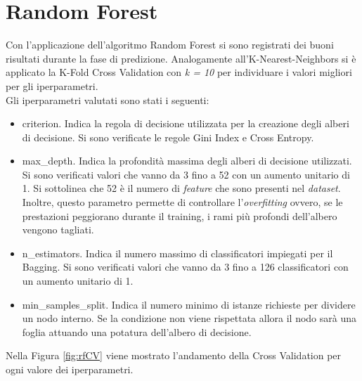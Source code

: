 \section{Random Forest}
Con l'applicazione dell'algoritmo Random Forest si sono registrati dei buoni risultati durante la fase di predizione. Analogamente all'K-Nearest-Neighbors si è applicato la K-Fold Cross Validation con \emph{k = 10} per individuare i valori migliori per gli iperparametri.\\
Gli iperparametri valutati sono stati i seguenti:
\begin{itemize}
	\item \textsf{criterion}. Indica la regola di decisione utilizzata per la creazione degli alberi di decisione. Si sono verificate le regole Gini Index e Cross Entropy.
	\item \textsf{max\_depth}. Indica la profondità massima degli alberi di decisione utilizzati. Si sono verificati valori che vanno da 3 fino a 52 con un aumento unitario di 1. Si sottolinea che 52 è il numero di \emph{feature} che sono presenti nel \emph{dataset}. Inoltre, questo parametro permette di controllare l'\emph{overfitting} ovvero, se le prestazioni peggiorano durante il training, i rami più profondi dell'albero vengono tagliati.
	\item \textsf{n\_estimators}. Indica il numero massimo di classificatori impiegati per il Bagging. Si sono verificati valori che vanno da 3 fino a 126 classificatori con un aumento unitario di 1.
	\item \textsf{min\_samples\_split}. Indica il numero minimo di istanze richieste per dividere un nodo interno. Se la condizione non viene rispettata allora il nodo sarà una foglia attuando una potatura dell'albero di decisione.
\end{itemize}
Nella Figura \ref{fig:rfCV} viene mostrato l'andamento della Cross Validation per ogni valore dei iperparametri.\\




